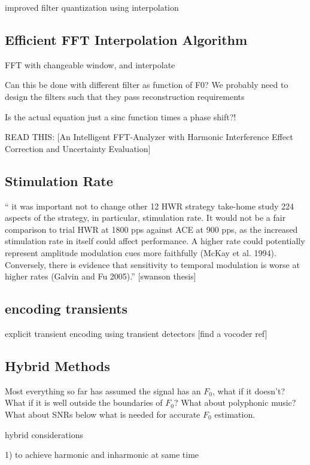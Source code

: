 \documentclass [11pt, proquest,oneside] {ganter_thesis}[2015/03/03]
\begin{document}
improved filter quantization using interpolation

\subsection{Efficient FFT Interpolation Algorithm}

FFT with changeable window, and interpolate

Can this be done with different filter as function of F0?
We probably need to design the filters such that they pass reconstruction requirements

Is the actual equation just a sinc function times a phase shift?!

READ THIS: [An Intelligent FFT-Analyzer with Harmonic Interference Effect Correction and Uncertainty Evaluation]

\subsection{Stimulation Rate}

`` it was important not to change other
12 HWR strategy take-home study 224
aspects of the strategy, in particular, stimulation rate. It would not be a fair comparison to trial HWR at 1800 pps against ACE at 900 pps, as the increased stimulation rate in itself could affect performance. A higher rate could potentially represent amplitude modulation cues more faithfully (McKay et al. 1994). Conversely, there is evidence that sensitivity to temporal modulation is worse at higher rates (Galvin and Fu 2005).''
[swanson thesis]

\subsection{encoding transients}

explicit transient encoding using transient detectors  [find a vocoder ref]

\subsection{Hybrid Methods}

Most everything so far has assumed the signal has an $F_0$, what if it doesn't?  What if it is well outside the boundaries of $F_0$?  What about polyphonic music?  What about SNRs below what is needed for accurate $F_0$ estimation.

hybrid considerations

1) to achieve harmonic and inharmonic at same time
\end{document}

